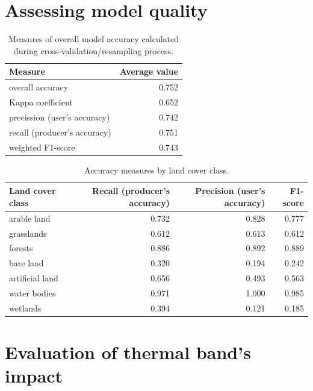 \documentclass{amuthesis}
\begin{document}
\hypertarget{sec-results-eval}{%
\chapter{Assessing model quality}\label{sec-results-eval}}

\hypertarget{tbl-tabela4}{}
\begin{table}
\caption{\label{tbl-tabela4}Measures of overall model accuracy calculated during
cross-validation/resampling process. }\tabularnewline

\centering
\begin{tabular}{|>{}l|>{}r|}
\toprule
\textbf{Measure} & \textbf{Average value}\\
\midrule
overall accuracy & 0.752\\
\hline
Kappa coefficient & 0.652\\
\hline
precission (user's accuracy) & 0.742\\
\hline
recall (producer's accuracy) & 0.751\\
\hline
weighted F1-score & 0.743\\
\bottomrule
\end{tabular}
\end{table}

\hypertarget{tbl-tabela5}{}
\begin{table}
\caption{\label{tbl-tabela5}Accuracy measures by land cover class. }\tabularnewline

\centering
\begin{tabular}{|>{}l|>{}r|>{}r|>{}r|}
\toprule
\textbf{Land cover class} & \textbf{Recall (producer's accuracy)} & \textbf{Precision (user's accuracy)} & \textbf{F1-score}\\
\midrule
arable land & 0.732 & 0.828 & 0.777\\
\hline
grasslands & 0.612 & 0.613 & 0.612\\
\hline
forests & 0.886 & 0.892 & 0.889\\
\hline
bare land & 0.320 & 0.194 & 0.242\\
\hline
artificial land & 0.656 & 0.493 & 0.563\\
\hline
water bodies & 0.971 & 1.000 & 0.985\\
\hline
wetlands & 0.394 & 0.121 & 0.185\\
\bottomrule
\end{tabular}
\end{table}


\hypertarget{sec-results-therm}{%
\chapter{Evaluation of thermal band's impact}\label{sec-results-therm}}
\end{document}
